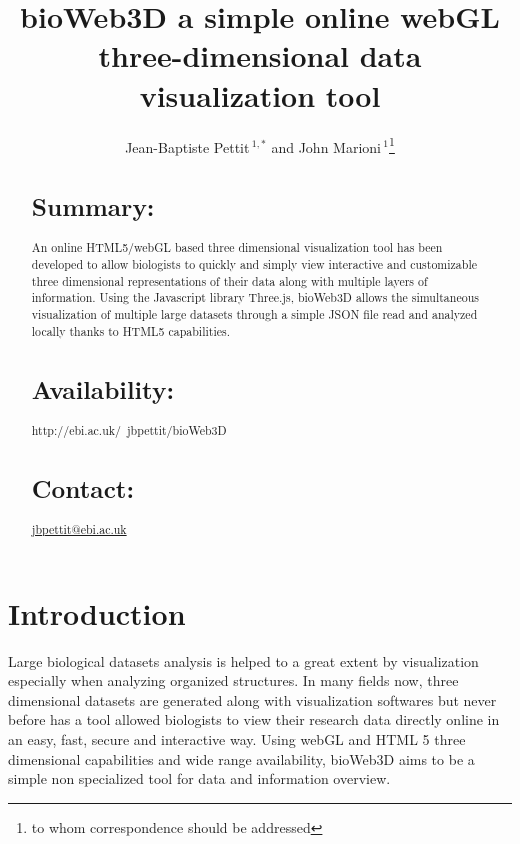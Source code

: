 \documentclass{bioinfo}
\begin{document}

\title[Application Note]{bioWeb3D a simple online webGL three-dimensional data visualization tool}
\author[Sample \textit{et~al}]{Jean-Baptiste Pettit\,$^{1,*}$ and John Marioni\,$^{1}$\footnote{to whom correspondence should be addressed}}
\address{$^{1}$Department of XXXXXXX, Address XXXX etc.\\
$^{1}$European Bioinformatics Institute}



\maketitle

\begin{abstract}

\section{Summary:}
An online HTML5/webGL based three dimensional visualization tool has been developed to allow biologists to quickly and simply view interactive and customizable three dimensional representations of their data along with multiple layers of information. Using the Javascript library Three.js, bioWeb3D allows the simultaneous visualization of multiple large datasets through a simple JSON file read and analyzed locally thanks to HTML5 capabilities.

\section{Availability:}
http://ebi.ac.uk/~jbpettit/bioWeb3D

\section{Contact:} \href{jbpettit@ebi.ac.uk}{jbpettit@ebi.ac.uk}
\end{abstract}

\section{Introduction}

Large biological datasets analysis is helped to a great extent by visualization especially when analyzing organized structures. In many fields now, three dimensional datasets are generated along with visualization softwares but never before has a tool allowed biologists to view their research data directly online in an easy, fast, secure and interactive way. Using webGL and HTML 5 three dimensional capabilities and wide range availability, bioWeb3D aims to be a simple non specialized tool for data and information overview.
\end{document}
